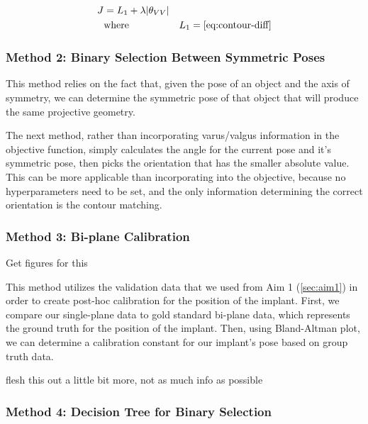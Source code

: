 \begin{equation}
    \begin{aligned}
        J &= L_1 + \lambda|\theta_{VV}| & \\
        & \text{where} & L_1 = \cref{eq:contour-diff}
    \end{aligned}
    \label{eq:vv-cost-function}
\end{equation}

\subsubsection{Method 2: Binary Selection Between Symmetric Poses}
This method relies on the fact that, given the pose of an object and the axis of symmetry, we can determine the symmetric pose of that object that will produce the same projective geometry.

The next method, rather than incorporating varus/valgus information in the objective function, simply calculates the angle for the current pose and it's symmetric pose, then picks the orientation that has the smaller absolute value. This can be more applicable than incorporating into the objective, because no hyperparameters need to be set, and the only information determining the correct orientation is the contour matching.

\subsubsection{Method 3: Bi-plane Calibration}

\begin{center}
    \Large{Get figures for this}
\end{center}

This method utilizes the validation data that we used from Aim 1 (\cref{sec:aim1}) in order to create post-hoc calibration for the position of the implant. First, we compare our single-plane data to gold standard bi-plane data, which represents the ground truth for the position of the implant. Then, using Bland-Altman plot, we can determine a calibration constant for our implant's pose based on group truth data.

\begin{center}
    \Large{flesh this out a little bit more, not as much info as possible}
\end{center}

\subsubsection{Method 4: Decision Tree for Binary Selection}

